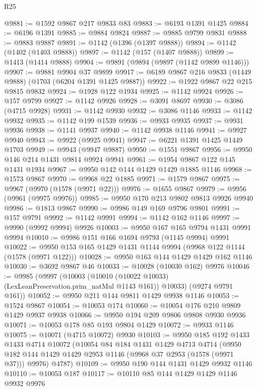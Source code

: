 \begin{lexlean}{R25}
\begin{coremodule}
@9881 := @1592 @9867 @217 @9833 @83
@9883 := @6193 @1391 @1425
@9884 := @6196 @1391
@9885 := @9884 @9824
@9887 := @9885 @9799 @9831
@9888 := @9883 @9887
@9891 := @1142 (@1396 (@1397 @9888))
@9894 := @1142 (@1402 (@1403 @9888))
@9897 := @1142 (@157 (@1407 @9888))
@9899 := @1413 (@1414 @9888)
@9904 := @9891 (@9894 (@9897 (@1142 @9899 @1146)))
@9907 := @9881 @9904 @37 @9899
@9917 := @6189 @9867 @216 @9833 (@1449 @9888) (@1703 (@6204 @1391 @1425 @9887))
@9922 := @1922 @9867 @22 @215 @9815 @9832
@9924 := @1928 @122 @1934
@9925 := @1142 @9924
@9926 := @157 @9799
@9927 := @1142 @9926
@9928 := @3091 @8697
@9930 := @3086 (@4715 @9928)
@9931 := @1142 @9930
@9932 := @3086 @1146
@9933 := @1142 @9932
@9935 := @1142 @199 @1539
@9936 := @9933 @9935
@9937 := @9931 @9936
@9938 := @1141 @9937
@9940 := @1142 @9938 @1146
@9941 := @9927 @9940
@9943 := @9922 (@9925 @9941)
@9947 := @6221 @1391 @1425 @1449 @1703
@9949 := @9943 (@9947 @9887)
@9950 := @1551 @9867
@9956 := @9950 @146 @214 @1431 @9814 @9924 @9941
@9961 := @1954 @9867 @122 @145 @1431 @1934
@9967 := @9950 @142 @144 @1429 @1429 @1885 @1146
@9968 := @1573 @9867
@9970 := @9968 @22 @1885
@9971 := @1579 @9867
@9975 := @9967 (@9970 (@1578 (@9971 @22)))
@9976 := @1655 @9867
@9979 := @9956 (@9961 (@9975 @9976))
@9985 := @9950 @170 @213 @9802 @9813 @9926 @9940
@9986 := @1813 @9867
@9990 := @9986 @149 @169 @9796 @9801
@9991 := @157 @9791
@9992 := @1142 @9991
@9994 := @1142 @162 @1146
@9997 := @9990 (@9992 @9994) @9926
@10003 := @9950 @167 @165 @9794 @1431 @9991 @9994
@10010 := @9986 @151 @166 @1694 @9793 (@1145 @9994) @9991
@10022 := @9950 @153 @165 @1429 @1431 @1144 @9994 (@9968 @122 @1144 (@1578 (@9971 @122)))
@10028 := @9950 @163 @144 @1429 @1429 @162 @1146
@10030 := @3692 @9867 @46
@10033 := @10028 (@10030 @162) @9976
@10046 := @9985
    (@9997
      (@10003 (@10010 (@10022 @10033) (LexLeanPreservation.prim_natMul @1143 @161)) @10033)
      (@9274 @9791 @161))
@10052 := @9950 @211 @144 @9811 @1429 @9938 @1146
@10053 := @1524 @9867
@10054 := @10053 @174
@10060 := @10054 @176 @210 @9809 @1429 @9937 @9938
@10066 := @9950 @194 @209 @9806 @9808 @9930 @9936
@10071 := @10053 @178 @85 @193 @9804 @1429
@10072 := @9933 @1146
@10075 := @10071 (@4715 @10072) @9930
@10103 := @9950
    @185
    @192
    @1433
    @1433
    @4714
    @10072
    (@10054
      @84
      @184
      @1431
      @1429
      @4713
      @4714
      (@9950 @182 @144 @1429 @1429 @2953 @1146 (@9968 @37 @2953 (@1578 (@9971 @37))) @9976)
      @4787)
@10109 := @9950 @190 @144 @1431 @1429 @9932 @1146
@10110 := @10053 @187
@10117 := @10110 @85 @144 @1429 @1429 @1146 @9932 @9976

\end{coremodule}
\end{lexlean}
